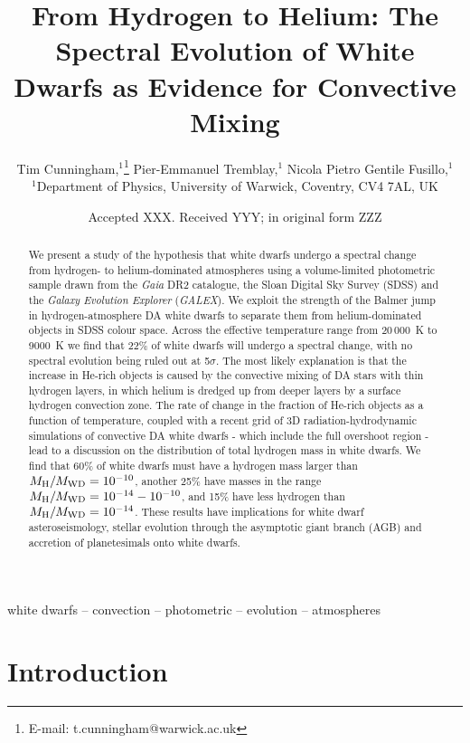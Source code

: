 \documentclass[a4paper,fleqn,usenatbib]{mnras}
\title[White Dwarf Spectral Evolution]{From Hydrogen to Helium: The Spectral Evolution of White Dwarfs as Evidence for Convective Mixing}
\author[T.~Cunningham et. al]{Tim Cunningham,$^{1}$\thanks{E-mail: t.cunningham@warwick.ac.uk}
Pier-Emmanuel Tremblay,$^{1}$ Nicola Pietro Gentile Fusillo,$^{1}$
\newauthor{Mark Hollands,$^{1}$ and Elena Cukanovaite$^{1}$}
\\
$^{1}$Department of Physics, University of Warwick, Coventry, CV4 7AL, UK
}
\date{Accepted XXX. Received YYY; in original form ZZZ}
\begin{document}
\label{firstpage}
\pagerange{\pageref{firstpage}--\pageref{lastpage}}
\maketitle

\begin{abstract}
We present a study of the hypothesis that white dwarfs undergo a spectral change from hydrogen- to helium-dominated atmospheres using a volume-limited photometric sample drawn from the {\it Gaia} DR2 catalogue, the Sloan Digital Sky Survey (SDSS) and the {\it Galaxy Evolution Explorer} ({\it GALEX}). We exploit the strength of the Balmer jump in hydrogen-atmosphere DA white dwarfs to separate them from helium-dominated objects in SDSS colour space. Across the effective temperature range from 20\,000~K to 9000~K we find that 22\% of white dwarfs will undergo a spectral change, with no spectral evolution being ruled out at 5$\sigma$. The most likely explanation is that the increase in He-rich objects is caused by the convective mixing of DA stars with thin hydrogen layers, in which helium is dredged up from deeper layers by a surface hydrogen convection zone. The rate of change in the fraction of He-rich objects as a function of temperature, coupled with a recent grid of 3D radiation-hydrodynamic simulations of convective DA white dwarfs - which include the full overshoot region - lead to a discussion on the distribution of total hydrogen mass in white dwarfs. We find that 60\% of white dwarfs must have a hydrogen mass larger than $M_{\rm H}/M_{\rm WD} = 10^{-10}$, another 25\% have masses in the range $M_{\rm H}/M_{\rm WD} = 10^{-14}-10^{-10}$, and 15\% have less hydrogen than $M_{\rm H}/M_{\rm WD} = 10^{-14}$. These results have implications for white dwarf asteroseismology, stellar evolution through the asymptotic giant branch (AGB) and accretion of planetesimals onto white dwarfs.
\end{abstract}

\begin{keywords}
white dwarfs -- convection -- photometric -- evolution -- atmospheres
\end{keywords}





\section{Introduction}
\label{intro}
\end{document}
